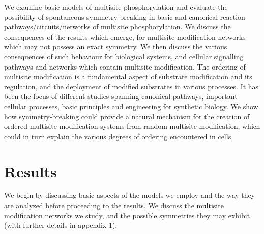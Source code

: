 \documentclass[9pt,lineno]{elife}
\begin{document}
We examine basic models of multisite phosphorylation and evaluate the possibility of spontaneous symmetry breaking in basic  and canonical reaction pathways/circuits/networks of multisite phosphorylation. We  discuss the consequences of the results which emerge,  for multisite modification networks which may not possess an exact symmetry. We then discuss the various consequences of such behaviour for biological systems, and cellular signalling pathways and networks which contain multisite modification. The ordering of multisite modification is a fundamental aspect of substrate modification and its regulation, and the deployment of  modified substrates in various processes. It has been the focus of different studies \cite{Kocieniewski2012,Lyons2013,Lossl2016,Valk2014} spanning  canonical pathways, important cellular processes, basic principles and engineering for synthetic biology. We show how symmetry-breaking could provide a natural mechanism for the creation of ordered multisite modification systems from random multisite modification, which could in turn explain the various degrees of ordering encountered in cells

\section{Results}

We begin by discussing basic aspects of the models we employ and the way they are analyzed before proceeding to the results. We discuss the multisite modification networks we study, and the possible symmetries they may exhibit (with further details in appendix 1).
\end{document}
